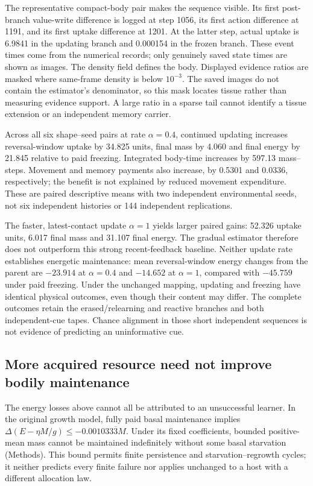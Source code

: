 The representative compact-body pair makes the sequence visible. Its first post-branch value-write difference is logged at step 1056, its first action difference at 1191, and its first uptake difference at 1201. At the latter step, actual uptake is 6.9841 in the updating branch and 0.000154 in the frozen branch. These event times come from the numerical records; only genuinely saved state times are shown as images. The density field defines the body. Displayed evidence ratios are masked where same-frame density is below $10^{-3}$. The saved images do not contain the estimator's denominator, so this mask locates tissue rather than measuring evidence support. A large ratio in a sparse tail cannot identify a tissue extension or an independent memory carrier.

Across all six shape--seed pairs at rate $\alpha=0.4$, continued updating increases reversal-window uptake by 34.825 units, final mass by 4.060 and final energy by 21.845 relative to paid freezing. Integrated body-time increases by 597.13 mass--steps. Movement and memory payments also increase, by 0.5301 and 0.0336, respectively; the benefit is not explained by reduced movement expenditure. These are paired descriptive means with two independent environmental seeds, not six independent histories or 144 independent replications.

The faster, latest-contact update $\alpha=1$ yields larger paired gains: 52.326 uptake units, 6.017 final mass and 31.107 final energy. The gradual estimator therefore does not outperform this strong recent-feedback baseline. Neither update rate establishes energetic maintenance: mean reversal-window energy changes from the parent are $-23.914$ at $\alpha=0.4$ and $-14.652$ at $\alpha=1$, compared with $-45.759$ under paid freezing. Under the unchanged mapping, updating and freezing have identical physical outcomes, even though their content may differ. The complete outcomes retain the erased/relearning and reactive branches and both independent-cue tapes. Chance alignment in those short independent sequences is not evidence of predicting an uninformative cue.


\subsection*{More acquired resource need not improve bodily maintenance}
The energy losses above cannot all be attributed to an unsuccessful learner. In the original growth model, fully paid basal maintenance implies $\Delta(E-\eta M/g)\leq-0.001033\overline{3}M$. Under its fixed coefficients, bounded positive-mean mass cannot be maintained indefinitely without some basal starvation (Methods). This bound permits finite persistence and starvation--regrowth cycles; it neither predicts every finite failure nor applies unchanged to a host with a different allocation law.

